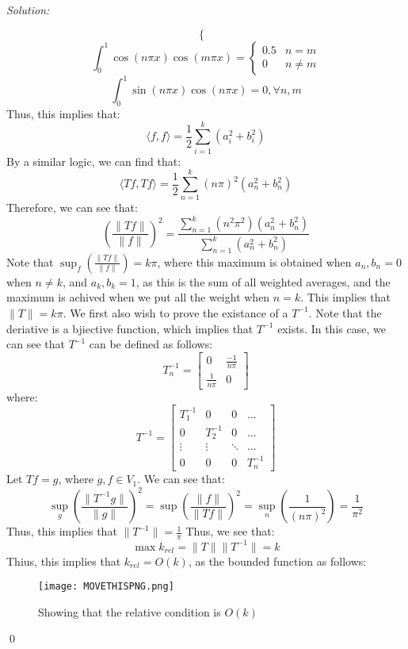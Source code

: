 \documentclass[12pt]{article}
\newenvironment{sol}
    {\emph{Solution:}
    }
    {
    \qed
    }
\begin{document}
\begin{sol}
\[\begin{cases}
    \end{cases}
    \]
    \[
    \int_{0}^{1} \cos(n \pi x) \cos(m \pi x) = \begin{cases}
        0.5 & n = m \\
        0 & n \neq m
    \end{cases}
    \]
    \[
    \int_{0}^{1} \sin(n \pi x) \cos( n \pi x) = 0, \forall n, m
    \]
    Thus, this implies that:
    \[
    \langle f , f \rangle = \frac{1}{2} \sum_{i = 1}^{k} (a_i^2 + b_i^2)
    \]
    By a similar logic, we can find that:
    \[
    \langle Tf, Tf \rangle = \frac{1}{2} \sum_{n=1}^{k} (n\pi)^2 (a_n^2 + b_n^2)
    \]
    Therefore, we can see that:
    \[
    \left( \frac{\|Tf\|}{\|f\|} \right)^2 = \frac{\sum_{n=1}^{k} (n^2 \pi^2) (a_n^2 + b_n^2)}{\sum_{n=1}^{k} (a_n^2 + b_n^2)}
    \]
    Note that $\sup_f \left( \frac{\|Tf \|}{\|f\|} \right) = k \pi$, where this maximum is obtained when $a_n, b_n = 0$ when $n \neq k$, and $a_k, b_k = 1$, as this is the sum of all weighted averages, and the maximum is achived when we put all the weight when $n = k$. This implies that $\|T \| = k\pi$. We first also wish to prove the existance of a $T^{-1}$. Note that the deriative is a bjiective function, which implies that $T^{-1}$ exists. In this case, we can see that $T^{-1}$ can be defined as follows:
    \[
    T_n^{-1} = \begin{bmatrix}
        0 & \frac{-1}{n \pi} \\
        \frac{1}{n \pi} & 0
    \end{bmatrix}
    \]
    where:
    \[
    T^{-1} = \begin{bmatrix}
        T_1^{-1} & 0 & 0 & \dots \\
        0 & T_2^{-1} & 0 & \dots \\
        \vdots & \vdots & \ddots & \dots \\
        0 & 0 & 0 & T_n^{-1}
    \end{bmatrix}
    \]
    Let $Tf = g$, where $g, f \in V_1$. We can see that:
    \[
    \sup_g \left( \frac{\|T^{-1}g\|}{\|g\|} \right)^2 = \sup \left( \frac{\|f\|}{\|Tf\|} \right)^2 = \sup_n \left( \frac{1}{(n\pi)^2} \right) = \frac{1}{\pi^2}
    \]
    Thus, this implies that $\|T^{-1}\| = \frac{1}{\pi}$ Thus, we see that:
    \[
    \max k_{rel} = \|T\| \|T^{-1}\| = k
    \]
    Thius, this implies that $k_{rel} = O(k)$, as the bounded function as follows:
    \begin{figure}[H]
        \centering
        \texttt{[image: MOVETHISPNG.png]}
        \caption{Showing that the relative condition is $O(k)$}
        \label{fig:enter-label}
    \end{figure}

\end{sol}
\end{document}
